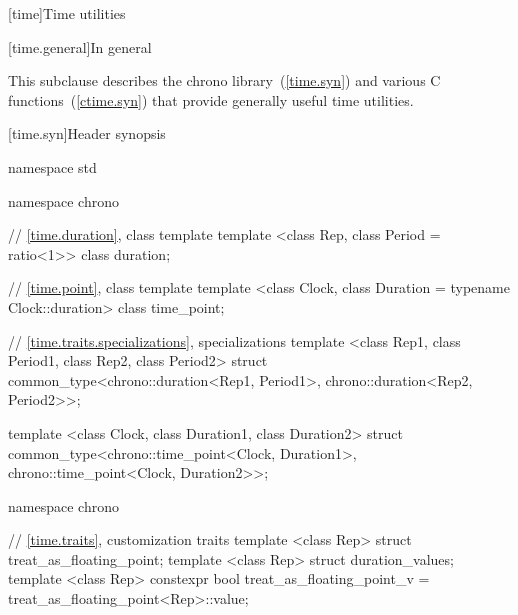 [time]{Time utilities}

[time.general]{In general}

\pnum
{}%
This subclause describes the chrono library~(\ref{time.syn}) and various C
functions~(\ref{ctime.syn}) that provide generally useful time
utilities.

[time.syn]{Header  synopsis}

%
%
\begin{codeblock}
namespace std {
  namespace chrono {
    // \ref{time.duration}, class template 
    template <class Rep, class Period = ratio<1>> class duration;

    // \ref{time.point}, class template 
    template <class Clock, class Duration = typename Clock::duration> class time_point;
  }

  // \ref{time.traits.specializations},  specializations
  template <class Rep1, class Period1, class Rep2, class Period2>
    struct common_type<chrono::duration<Rep1, Period1>,
                       chrono::duration<Rep2, Period2>>;

  template <class Clock, class Duration1, class Duration2>
    struct common_type<chrono::time_point<Clock, Duration1>,
                       chrono::time_point<Clock, Duration2>>;

  namespace chrono {
    // \ref{time.traits}, customization traits
    template <class Rep> struct treat_as_floating_point;
    template <class Rep> struct duration_values;
    template <class Rep> constexpr bool treat_as_floating_point_v
      = treat_as_floating_point<Rep>::value;

}}
\end{codeblock}
